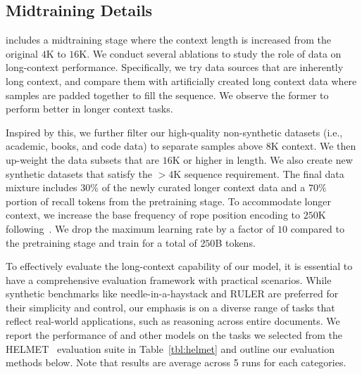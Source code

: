 \subsection{Midtraining Details}

\model includes a midtraining stage where the context length is increased from the original $4$K to $16$K. We conduct several ablations to study the role of data on long-context performance. Specifically, we try data sources that are inherently long context, and compare them with artificially created long context data where samples are padded together to fill the sequence. We observe the former to perform better in longer context tasks. 

Inspired by this, we further filter our high-quality non-synthetic datasets (i.e., academic, books, and code data) to separate samples above $8$K context. We then up-weight the data subsets that are $16$K or higher in length. We also create new synthetic datasets that satisfy the $>4$K sequence requirement. The final data mixture includes $30\%$ of the newly curated longer context data and a $70\%$ portion of recall tokens from the pretraining stage. To accommodate longer context, we increase the base frequency of rope position encoding to $250$K following~\cite{llama3report}. We drop the maximum learning rate by a factor of $10$ compared to the pretraining stage and train for a total of $250$B tokens.

To effectively evaluate the long-context capability of our model, it is essential to have a comprehensive evaluation framework with practical scenarios. While synthetic benchmarks like needle-in-a-haystack and RULER are preferred for their simplicity and control, our emphasis is on a diverse range of tasks that reflect real-world applications, such as reasoning across entire documents. 
We report the performance of \model and other models on the tasks we selected from the HELMET~\cite{yen2024helmetevaluatelongcontextlanguage} evaluation suite in Table~\ref{tbl:helmet} and outline our evaluation methods below. Note that results are average across 5 runs for each categories.

